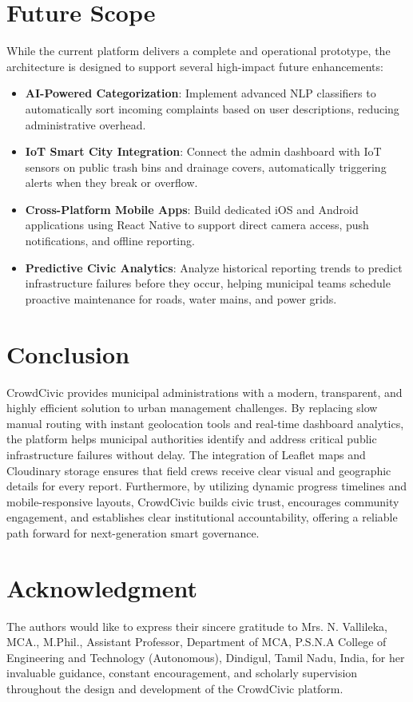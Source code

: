 \documentclass[conference]{IEEEtran}
\begin{document}
\section{Future Scope}
While the current platform delivers a complete and operational prototype, the architecture is designed to support several high-impact future enhancements:
\begin{itemize}
    \item \textbf{AI-Powered Categorization}: Implement advanced NLP classifiers to automatically sort incoming complaints based on user descriptions, reducing administrative overhead.
    \item \textbf{IoT Smart City Integration}: Connect the admin dashboard with IoT sensors on public trash bins and drainage covers, automatically triggering alerts when they break or overflow.
    \item \textbf{Cross-Platform Mobile Apps}: Build dedicated iOS and Android applications using React Native to support direct camera access, push notifications, and offline reporting.
    \item \textbf{Predictive Civic Analytics}: Analyze historical reporting trends to predict infrastructure failures before they occur, helping municipal teams schedule proactive maintenance for roads, water mains, and power grids.
\end{itemize}

\section{Conclusion}
CrowdCivic provides municipal administrations with a modern, transparent, and highly efficient solution to urban management challenges. By replacing slow manual routing with instant geolocation tools and real-time dashboard analytics, the platform helps municipal authorities identify and address critical public infrastructure failures without delay. The integration of Leaflet maps and Cloudinary storage ensures that field crews receive clear visual and geographic details for every report. Furthermore, by utilizing dynamic progress timelines and mobile-responsive layouts, CrowdCivic builds civic trust, encourages community engagement, and establishes clear institutional accountability, offering a reliable path forward for next-generation smart governance.

\section*{Acknowledgment}
The authors would like to express their sincere gratitude to Mrs. N. Vallileka, MCA., M.Phil., Assistant Professor, Department of MCA, P.S.N.A College of Engineering and Technology (Autonomous), Dindigul, Tamil Nadu, India, for her invaluable guidance, constant encouragement, and scholarly supervision throughout the design and development of the CrowdCivic platform.
\end{document}
